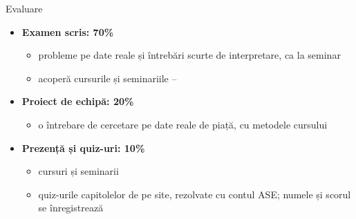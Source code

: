 \begin{frame}{Evaluare}
\itemsize{\small}
\begin{itemize}
    \item \textbf{Examen scris: 70\%}
    \begin{itemize}
        \item probleme pe date reale și întrebări scurte de interpretare, ca la seminar
        \item acoperă cursurile și seminariile --
    \end{itemize}
    \item \textbf{Proiect de echipă: 20\%}
    \begin{itemize}
        \item o întrebare de cercetare pe date reale de piață, cu metodele cursului
    \end{itemize}
    \item \textbf{Prezență și quiz-uri: 10\%}
    \begin{itemize}
        \item cursuri și seminarii
        \item quiz-urile capitolelor de pe site, rezolvate cu contul ASE; numele și scorul se înregistrează
    \end{itemize}
\end{itemize}
\end{frame}

